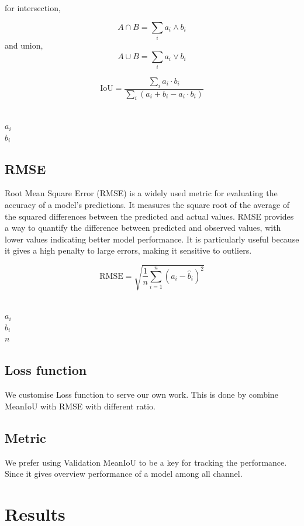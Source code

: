 \documentclass[conference]{IEEEtran}
\begin{document}
for intersection,

\[
A \cap B = \sum_{i} a_i \wedge  b_i
\]
and union,
\[
A \cup B = \sum_{i} a_i \vee  b_i
\]

\[
\text{IoU} = \frac{\sum_{i} a_i \cdot b_i}{\sum_{i} (a_i + b_i - a_i \cdot b_i)}
\]


 \\
$a_i$  \\
$b_i$ 




\subsection{RMSE}
Root Mean Square Error (RMSE) is a widely used metric for evaluating the accuracy of a model's predictions. It measures the square root of the average of the squared differences between the predicted and actual values. RMSE provides a way to quantify the difference between predicted and observed values, with lower values indicating better model performance. It is particularly useful because it gives a high penalty to large errors, making it sensitive to outliers.

\[
\text{RMSE} = \sqrt{\frac{1}{n} \sum_{i=1}^{n} (a_i - \hat{b}_i)^2}
\]

 \\
$a_i$  \\
$b_i$  \\
$n$ 

\subsection*{Loss function}
We customise Loss function to serve our own work. This is done by combine MeanIoU with RMSE with different ratio.

\subsection*{Metric}
We prefer using Validation MeanIoU to be a key for tracking the performance. Since it gives overview performance of a model among all channel.


\section{Results}
\end{document}
